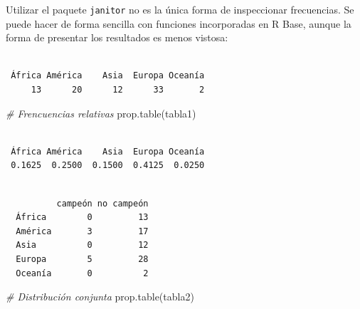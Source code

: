 \documentclass[
]{book}
\newenvironment{Shaded}{\begin{snugshade}}{\end{snugshade}}
\newcommand{\CommentTok}[1]{\textcolor[rgb]{0.56,0.35,0.01}{\textit{#1}}}
\newcommand{\FunctionTok}[1]{\textcolor[rgb]{0.00,0.00,0.00}{#1}}
\newcommand{\NormalTok}[1]{#1}
\newcommand{\OtherTok}[1]{\textcolor[rgb]{0.56,0.35,0.01}{#1}}
\newcommand{\SpecialCharTok}[1]{\textcolor[rgb]{0.00,0.00,0.00}{#1}}
\begin{document}
Utilizar el paquete \texttt{janitor} no es la única forma de inspeccionar frecuencias. Se puede hacer de forma sencilla con funciones incorporadas en R Base, aunque la forma de presentar los resultados es menos vistosa:

\begin{Shaded}
\end{Shaded}

\begin{verbatim}

 África América    Asia  Europa Oceanía 
     13      20      12      33       2 
\end{verbatim}

\begin{Shaded}
\begin{Highlighting}[]
\CommentTok{\# Frencuencias relativas}
\FunctionTok{prop.table}\NormalTok{(tabla1)}
\end{Highlighting}
\end{Shaded}

\begin{verbatim}

 África América    Asia  Europa Oceanía 
 0.1625  0.2500  0.1500  0.4125  0.0250 
\end{verbatim}

\begin{Shaded}
\end{Shaded}

\begin{verbatim}
         
          campeón no campeón
  África        0         13
  América       3         17
  Asia          0         12
  Europa        5         28
  Oceanía       0          2
\end{verbatim}

\begin{Shaded}
\begin{Highlighting}[]
\CommentTok{\# Distribución conjunta}
\FunctionTok{prop.table}\NormalTok{(tabla2)}
\end{Highlighting}
\end{Shaded}
\end{document}
